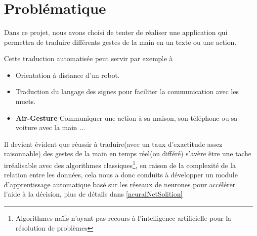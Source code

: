 \section{Problématique}
\paragraph{}
Dans ce projet, nous avons choisi de tenter de réaliser une application qui permettra de traduire différents gestes de la main en un texte ou une action.\par
Cette traduction automatisée peut servir par exemple à 
\begin{itemize}[label=\textbullet]
	\item Orientation à distance d'un robot.
	\item Traduction du langage des signes pour faciliter la communication avec les muets.
	\item \textbf{Air-Gesture} Communiquer une action à sa maison, son téléphone ou sa voiture avec la main ...
\end{itemize}\par 
Il devient évident que réussir à traduire(avec un taux d'exactitude assez raisonnable) des gestes de la main en temps réel(ou différé) s'avère être une tache irréalisable avec des algorithmes classiques\footnote{Algorithmes naïfs n'ayant pas recours à l'intelligence artificielle pour la résolution de problèmes}, en raison de la complexité de la relation entre les données, cela nous a donc conduits à développer un module d'apprentissage automatique basé sur les réseaux de neurones \label{ProlemSolver}
 pour accélérer l'aide à la décision, plus de détails dans \ref{neuralNetSolition}